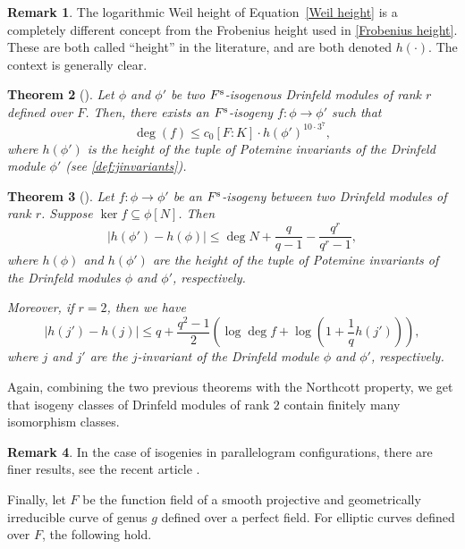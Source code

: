\documentclass[11pt]{article}
\newtheorem{theorem}{Theorem}[section]
\theoremstyle{definition}
\newtheorem{remark}[theorem]{Remark}
\renewcommand\leq{\leqslant}
\newcommand{\Fs}{F^{\text{\rm s}}}
\begin{document}
\begin{remark}
    The logarithmic Weil height of Equation~\eqref{Weil height} is a completely different concept from the Frobenius height used in \cref{Frobenius height}. These are both called ``height'' in the literature, and are both denoted $h(\cdot)$. The context is generally clear.
\end{remark}

\begin{theorem}[]
    Let $ \phi $ and $ \phi'$ be two $\Fs$-isogenous Drinfeld modules of rank $r$ defined over $F$. Then, there exists an $\Fs$-isogeny $f : \phi \rightarrow \phi'$ such that
    \[\deg(f)\leq c_0 [F:K] \cdot h(\phi')^{10\cdot 3^7},\]
    where $h(\phi')$ is the height of the tuple of Potemine invariants of the Drinfeld module $\phi'$ (see \cref{def:jinvariants}).
\end{theorem}

\begin{theorem}[]\label{DM}
    Let $f: \phi \rightarrow \phi'$ be an $\Fs$-isogeny between two Drinfeld modules of rank $r$. Suppose $\ker f\subseteq \phi[N]$. Then
\[|h(\phi')-h(\phi)|\leq \deg N+ \frac{q}{q-1}-\frac{q^r}{q^r-1},\]
where $h(\phi)$ and $h(\phi')$ are the height of the tuple of Potemine invariants of the Drinfeld modules $\phi$ and $\phi'$, respectively. 

    Moreover, if $r=2$, then we have
    \[|h(j')-h(j)|\leq q+ \frac{q^2-1}{2}\left( \log \deg f + \log\left(1+\frac{1}{q}h(j')\right)\right),\]
    where $j$ and $j'$ are the $j$-invariant of the Drinfeld module $\phi$ and $\phi'$, respectively.
\end{theorem}

Again, combining the two previous theorems with the Northcott property, we get that isogeny classes of Drinfeld modules of rank $2$ contain finitely many isomorphism classes.

\begin{remark}
In the case of isogenies in parallelogram configurations, there are finer results, see the recent article \cite{BGP_2025}. 
\end{remark}

Finally, let $F$ be the function field of a smooth projective and geometrically irreducible curve of genus $g$ defined over a perfect field. For elliptic curves defined over $F$, the following hold.
\end{document}

